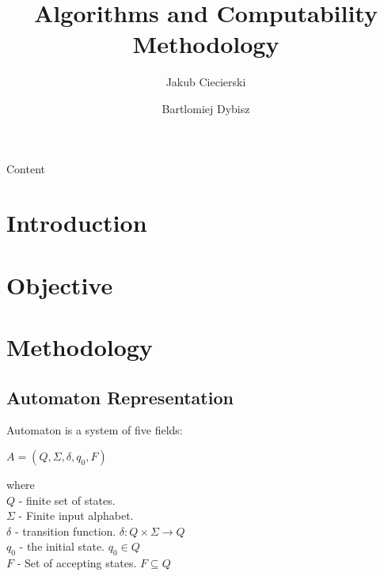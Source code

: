 \documentclass[runningheads,a4paper]{llncs}
\begin{document}
\vspace{-100pt}
\mainmatter

\title{Algorithms and Computability \\Methodology}


\author{Jakub Ciecierski \and Bartlomiej Dybisz}




\maketitle

\abstract{} Content \\


\section{Introduction}

\section{Objective}

\section{Methodology}

\subsection{Automaton Representation}

Automaton is a system of five fields:
\begin{center}
	$A = (Q, \Sigma, \delta, q_0, F)$
\end{center}

where \\
$Q$ - finite set of states. \\
$\Sigma$ - Finite input alphabet. \\
$\delta$ - transition function. $\delta: Q \times \Sigma \rightarrow Q$ \\
$q_0$ - the initial state. $q_0 \in Q$ \\
$F$ - Set of accepting states. $F \subseteq Q$ \\
\end{document}
